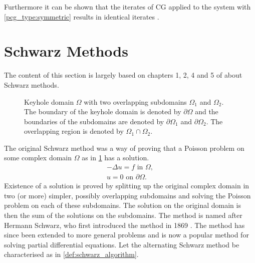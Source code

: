 Furthermore it can be shown that the iterates of CG applied to the system with \ref{pcg_type:symmetric} results in identical iterates \cite[Algorithm 9.2]{iter_method_saad}.

\section{Schwarz Methods}\label{sec:schwarz_methods}
The content of this section is largely based on chapters 1, 2, 4 and 5 of \citeauthor{schwarz_methods_Dolean_2015} about Schwarz methods.
\begin{figure}[H]
  \centering
  
  \caption{Keyhole domain $\Omega$ with two overlapping subdomains $\Omega_1$ and $\Omega_2$. The boundary of the keyhole domain is denoted by $\partial\Omega$ and the boundaries of the subdomains are denoted by $\partial\Omega_1$ and $\partial\Omega_2$. The overlapping region is denoted by $\Omega_1 \cap \Omega_2$.}
  \label{fig:keyhole_domain}
\end{figure}
The original Schwarz method was a way of proving that a Poisson problem on some complex domain $\Omega$ as in \cref{fig:keyhole_domain} has a solution.
\begin{equation}
    \begin{array}{c}
        -\Delta u = f \text{ in } \Omega, \\
        u = 0 \text{ on } \partial \Omega.
    \end{array}
    \label{eq:poisson_problem}
\end{equation}
Existence of a solution is proved by splitting up the original complex domain in two (or more) simpler, possibly overlapping subdomains and solving the Poisson problem on each of these subdomains. The solution on the original domain is then the sum of the solutions on the subdomains. The method is named after Hermann Schwarz, who first introduced the method in 1869 \cite{og_schwarz_method_Schwarz}. The method has since been extended to more general problems and is now a popular method for solving partial differential equations. Let the alternating Schwarz method be characterised as in \cref{def:schwarz_algorithm}.
